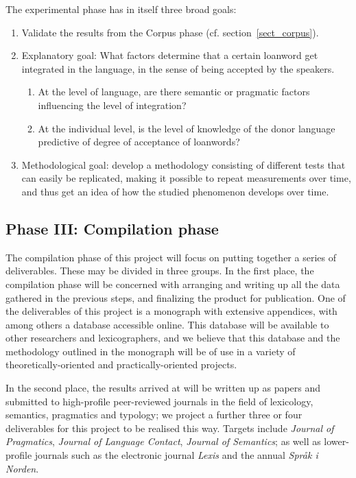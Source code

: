 \documentclass[a4paper]{article}
\begin{document}
The experimental phase has in itself three broad goals:
\begin{enumerate}
	\item Validate the results from the Corpus phase (cf. section~\ref{sect_corpus}).
	\item Explanatory goal:
	What factors determine that a certain loanword get integrated in the language, in the sense of being accepted by the speakers.
	\begin{enumerate}
		\item At the level of language, are there semantic or pragmatic factors influencing the level of integration?
		\item At the individual level, is the level of knowledge of the donor language predictive of degree of acceptance of loanwords?
	\end{enumerate}
	\item Methodological goal: develop a methodology consisting of different tests that can easily be replicated, making it possible to repeat measurements over time, and thus get an idea of how the studied phenomenon develops over time. 
\end{enumerate}
	




\subsection{Phase III: Compilation phase}

The compilation phase of this project will focus on putting together a series of deliverables. These may be divided in three groups.
In the first place, the compilation phase will be concerned with arranging and writing up all the data gathered in the previous steps, and finalizing the product for publication. One of the deliverables of this project is a monograph with extensive appendices, with among others a database accessible online. This database will be available to other researchers and lexicographers, and we believe that this database and the methodology outlined in the monograph will be of use in a variety of theoretically-oriented and practically-oriented projects.

In the second place, the results arrived at will be written up as papers and submitted to high-profile peer-reviewed journals in the field of lexicology, semantics, pragmatics and typology; we project a further three or four deliverables for this project to be realised this way. Targets include \emph{Journal of Pragmatics}, \emph{Journal of Language Contact}, \emph{Journal of Semantics}; as well as lower-profile journals such as the electronic journal \emph{Lexis} and the annual \emph{Spr\aa k i Norden}.
\end{document}
